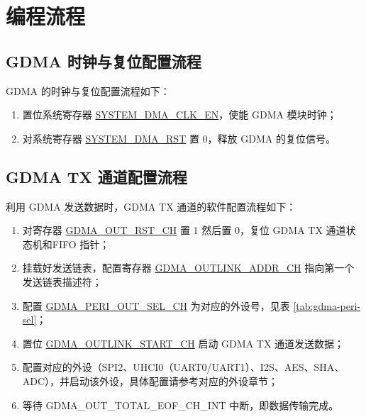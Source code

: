 \documentclass[main\_\_CN.tex]{subfiles}
\begin{document}
\section{编程流程}

\subsection{GDMA 时钟与复位配置流程}
GDMA 的时钟与复位配置流程如下：
\begin{enumerate}
    \item 置位系统寄存器 \hyperref[fielddesc:SYSTEMDMACLKEN]{SYSTEM\_DMA\_CLK\_EN}，使能 GDMA 模块时钟；
    \item 对系统寄存器 \hyperref[fielddesc:SYSTEMDMARST]{SYSTEM\_DMA\_RST} 置 0，释放 GDMA 的复位信号。
\end{enumerate}

\subsection{GDMA TX 通道配置流程}
利用 GDMA 发送数据时，GDMA TX 通道的软件配置流程如下：
\begin{enumerate}
    \item 对寄存器 \hyperref[fielddesc:GDMAOUTRSTCHN]{GDMA\_OUT\_RST\_CH} 置 1 然后置 0，复位 GDMA TX 通道状态机和FIFO 指针；
    \item 挂载好发送链表，配置寄存器 \hyperref[fielddesc:GDMAOUTLINKADDRCHN]{GDMA\_OUTLINK\_ADDR\_CH} 指向第一个发送链表描述符；
    \item 配置 \hyperref[fielddesc:GDMAPERIOUTSELCHN]{GDMA\_PERI\_OUT\_SEL\_CH} 为对应的外设号，见表 \ref{tab:gdma-peri-sel}；
    \item 置位 \hyperref[fielddesc:GDMAOUTLINKSTARTCHN]{GDMA\_OUTLINK\_START\_CH} 启动 GDMA TX 通道发送数据；
    \item 配置对应的外设（SPI2、UHCI0（UART0/UART1）、I2S、AES、SHA、ADC），并启动该外设，具体配置请参考对应的外设章节；
    \item 等待 GDMA\_OUT\_TOTAL\_EOF\_CH\_INT 中断，即数据传输完成。
\end{enumerate}   
\end{document}
